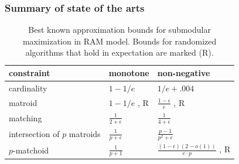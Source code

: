 \documentclass{beamer}
\newcommand{\eps}{\epsilon}
\begin{document}
\begin{frame}
  \frametitle{Summary of state of the arts}
  \begin{table}[t]
\centering
\begin{tabular}{|l|l|l|}
\hline
constraint & monotone  &  non-negative \\
\hline
cardinality & $1 - 1/e$  \cite{NWF78} & $1/e + .004$ \cite{BFN+14}\\
\hline
matroid & $1 - 1/e$ \cite{CCP+11}, R & $\frac{1 - \eps}{e}$ \cite{FNS11}, R \\
\hline
matching & $\frac{1}{2 + \eps}$ \cite{FNS+11} & $\frac{1}{4 + \eps}$ \cite{FNS+11}\\
\hline
intersection of $p$ matroids & $\frac{1}{p + \eps}$ \cite{LSV10} & $\frac{p - 1}{p^2 + \eps}$ \cite{LSV10}\\
\hline
$p$-matchoid & $\frac{1}{p + 1}$ \cite{CCP+11,NWF78} & $\frac{(1-\eps)(2-o(1))}{e\cdot p}$ \cite{FNS+11,VCZ11}, R\\
\hline
\end{tabular}
\caption{Best known approximation bounds for submodular maximization in RAM model. Bounds for randomized algorithms that hold in expectation are marked (R).}
\label{table:centralized}
\end{table}
\end{frame}





\end{document}
